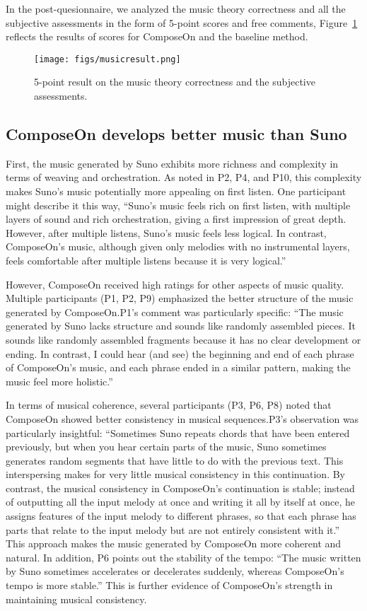 In the post-quesionnaire, we analyzed the music theory correctness and all the subjective assessments in the form of 5-point scores and free comments, Figure~\ref{fig:result} reflects the results of scores for ComposeOn and the baseline method.
\begin{figure}[h]
\centering
\texttt{[image: figs/musicresult.png]}
\caption{5-point result on the music theory correctness and the subjective assessments.}
\label{fig:result}
\end{figure}

\subsection{ComposeOn develops better music than Suno}
First, the music generated by Suno exhibits more richness and complexity in terms of weaving and orchestration. As noted in P2, P4, and P10, this complexity makes Suno's music potentially more appealing on first listen. One participant might describe it this way, “Suno's music feels rich on first listen, with multiple layers of sound and rich orchestration, giving a first impression of great depth. However, after multiple listens, Suno's music feels less logical. In contrast, ComposeOn's music, although given only melodies with no instrumental layers, feels comfortable after multiple listens because it is very logical.”

However, ComposeOn received high ratings for other aspects of music quality. Multiple participants (P1, P2, P9) emphasized the better structure of the music generated by ComposeOn.P1's comment was particularly specific: “The music generated by Suno lacks structure and sounds like randomly assembled pieces. It sounds like randomly assembled fragments because it has no clear development or ending. In contrast, I could hear (and see) the beginning and end of each phrase of ComposeOn's music, and each phrase ended in a similar pattern, making the music feel more holistic.”

In terms of musical coherence, several participants (P3, P6, P8) noted that ComposeOn showed better consistency in musical sequences.P3's observation was particularly insightful: “Sometimes Suno repeats chords that have been entered previously, but when you hear certain parts of the music, Suno sometimes generates random segments that have little to do with the previous text. This interspersing makes for very little musical consistency in this continuation. By contrast, the musical consistency in ComposeOn's continuation is stable; instead of outputting all the input melody at once and writing it all by itself at once, he assigns features of the input melody to different phrases, so that each phrase has parts that relate to the input melody but are not entirely consistent with it.” This approach makes the music generated by ComposeOn more coherent and natural. In addition, P6 points out the stability of the tempo: “The music written by Suno sometimes accelerates or decelerates suddenly, whereas ComposeOn's tempo is more stable.” This is further evidence of ComposeOn's strength in maintaining musical consistency.

